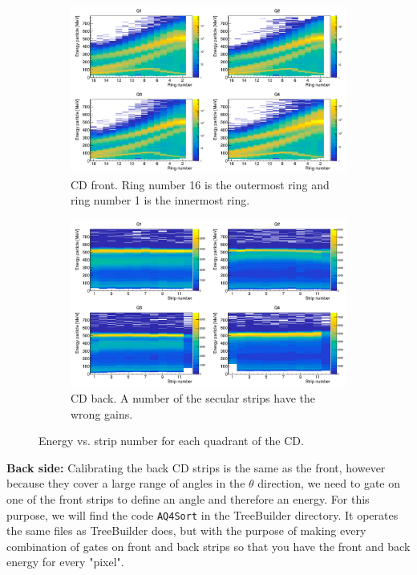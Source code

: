 \documentclass[twoside,english]{uiofysmaster/uiofysmaster}
\begin{document}
\begin{figure}
	\centering
	\begin{subfigure}{\textwidth}
		\centering
		\includegraphics[width=\textwidth]{../Plots/plotting/E_vs_f-strip_all_Q.png}
		\caption{CD front. Ring number 16 is the outermost ring and ring number 1 is the innermost ring.}
		\label{fig:cal_CD_front}
	\end{subfigure}
	\begin{subfigure}{\textwidth}
		\centering
		\includegraphics[width=\textwidth]{../Plots/plotting/E_vs_b-strip_all_Q.png}
		\caption{CD back. A number of the secular strips have the wrong gains.}
		\label{fig:cal_CD_back}
	\end{subfigure}
	\caption{Energy vs. strip number for each quadrant of the CD.}
	\label{fig:cal_CD}
\end{figure}


\textbf{Back side:} \newline
Calibrating the back CD strips is the same as the front, however because they cover a large range of angles in the $\theta$ direction, we need to gate on one of the front strips to define an angle and therefore an energy. For this purpose, we will find the code \texttt{AQ4Sort} in the TreeBuilder directory. It operates the same files as TreeBuilder does, but with the purpose of making every combination of gates on front and back strips so that you have the front and back energy for every "pixel". 
\end{document}
